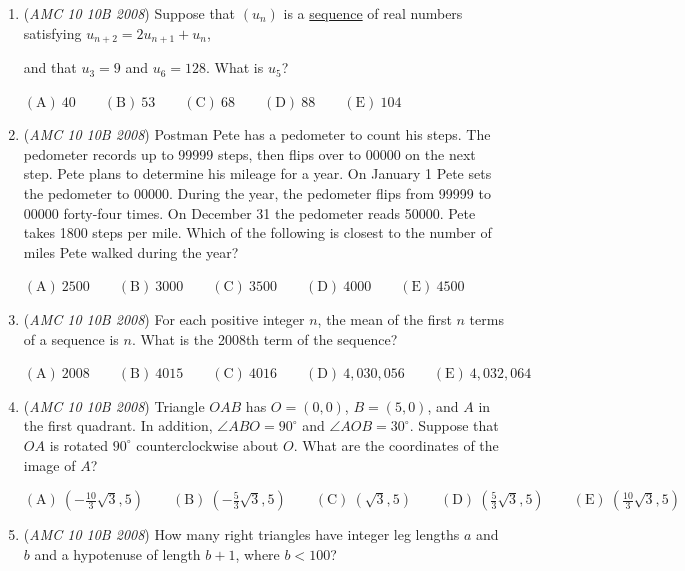 \begin{enumerate}
 $\mathrm{(A)}\ \sqrt{10}\qquad\mathrm{(B)}\ \frac{7}{2}\qquad\mathrm{(C)}\ \sqrt{14}\qquad\mathrm{(D)}\ \sqrt{15}\qquad\mathrm{(E)}\ 4$


	\item (\textit{AMC 10 10B 2008}) Suppose that $(u_n)$ is a \href{https://artofproblemsolving.com/wiki/index.php?title=Sequence}{sequence} of real numbers satisfying $u_{n+2}=2u_{n+1}+u_n$,


 and that $u_3=9$ and $u_6=128$. What is $u_5$?


 $\mathrm{(A)}\ 40\qquad\mathrm{(B)}\ 53\qquad\mathrm{(C)}\ 68\qquad\mathrm{(D)}\ 88\qquad\mathrm{(E)}\ 104$


	\item (\textit{AMC 10 10B 2008}) Postman Pete has a pedometer to count his steps. The pedometer records up to 99999 steps, then flips over to 00000 on the next step. Pete plans to determine his mileage for a year. On January 1 Pete sets the pedometer to 00000. During the year, the pedometer flips from 99999 to 00000 forty-four 
times. On December 31 the pedometer reads 50000. Pete takes 1800 steps per mile. Which of the following is closest to the number of miles Pete walked during the year?


 $\mathrm{(A)}\ 2500\qquad\mathrm{(B)}\ 3000\qquad\mathrm{(C)}\ 3500\qquad\mathrm{(D)}\ 4000\qquad\mathrm{(E)}\ 4500$


	\item (\textit{AMC 10 10B 2008}) For each positive integer $n$, the mean of the first $n$ terms of a sequence is $n$. What is the 2008th term of the sequence?


 $\mathrm{(A)}\ {{{2008}}} \qquad \mathrm{(B)}\ {{{4015}}} \qquad \mathrm{(C)}\ {{{4016}}} \qquad \mathrm{(D)}\ {{{4,030,056}}} \qquad \mathrm{(E)}\ {{{4,032,064}}}$


	\item (\textit{AMC 10 10B 2008}) Triangle $OAB$ has $O=(0,0)$, $B=(5,0)$, and $A$ in the first quadrant. In addition, $\angle ABO=90^\circ$ and $\angle AOB=30^\circ$. Suppose that $OA$ is rotated $90^\circ$ counterclockwise about $O$. What are the coordinates of the image of $A$? 


 $\mathrm{(A)}\ \left( - \frac {10}{3}\sqrt {3},5\right) \qquad \mathrm{(B)}\ \left( - \frac {5}{3}\sqrt {3},5\right) \qquad \mathrm{(C)}\ \left(\sqrt {3},5\right) \qquad \mathrm{(D)}\ \left(\frac {5}{3}\sqrt {3},5\right) \qquad \mathrm{(E)}\ \left(\frac {10}{3}\sqrt {3},5\right)$


	\item (\textit{AMC 10 10B 2008}) How many right triangles have integer leg lengths $a$ and $b$ and a hypotenuse of length $b+1$, where $b<100$?



\end{enumerate}

